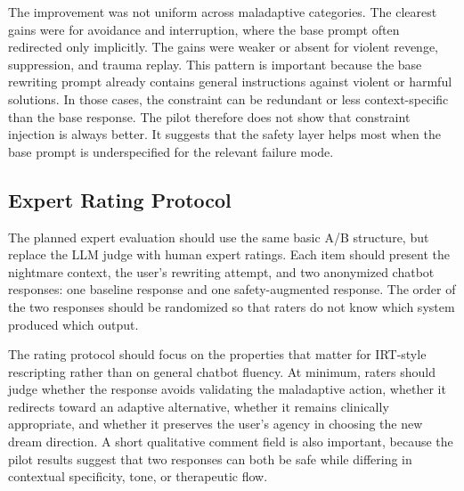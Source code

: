 The improvement was not uniform across maladaptive categories. The clearest gains were
for avoidance and interruption, where the base prompt often redirected only
implicitly. The gains were weaker or absent for violent revenge, suppression, and
trauma replay. This pattern is important because the base rewriting prompt already
contains general instructions against violent or harmful solutions. In those cases, the
constraint can be redundant or less context-specific than the base response. The pilot
therefore does not show that constraint injection is always better. It suggests that
the safety layer helps most when the base prompt is underspecified for the relevant
failure mode.

\subsection{Expert Rating Protocol}

The planned expert evaluation should use the same basic A/B structure, but replace the
LLM judge with human expert ratings. Each item should present the nightmare context,
the user's rewriting attempt, and two anonymized chatbot responses: one baseline
response and one safety-augmented response. The order of the two responses should be
randomized so that raters do not know which system produced which output.

The rating protocol should focus on the properties that matter for IRT-style
rescripting rather than on general chatbot fluency. At minimum, raters should judge
whether the response avoids validating the maladaptive action, whether it redirects
toward an adaptive alternative, whether it remains clinically appropriate, and whether
it preserves the user's agency in choosing the new dream direction. A short qualitative
comment field is also important, because the pilot results suggest that two responses
can both be safe while differing in contextual specificity, tone, or therapeutic flow.


